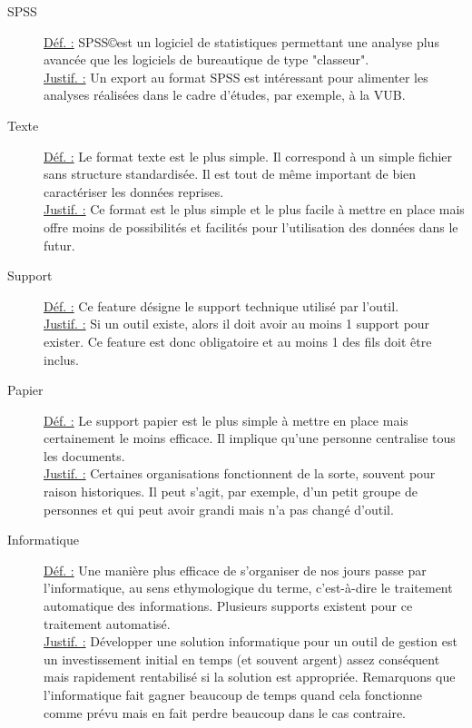 \begin{description}
\item [SPSS]
\underline{Déf. :}  SPSS\copyright est un logiciel de statistiques permettant une analyse plus avancée que les logiciels de bureautique de type "classeur".
\\ \underline{Justif. :}  Un export au format SPSS est intéressant pour alimenter les analyses réalisées dans le cadre d'études,  par exemple,  à la VUB.
\newline

\item [Texte]
\underline{Déf. :}  Le format texte est le plus simple.  Il correspond à un simple fichier sans structure standardisée.   Il est tout de même important de bien caractériser les données reprises.
\\ \underline{Justif. :}  Ce format est le plus simple et le plus facile à mettre en place mais offre moins de possibilités et facilités pour l'utilisation des données dans le futur.
\newline

\begin{center}
\end{center}

\item [Support]
\underline{Déf. :}  Ce feature désigne le support technique utilisé par l'outil.
\\ \underline{Justif. :}  Si un outil existe,  alors il doit avoir au moins 1 support pour exister.  Ce feature est donc obligatoire et au moins 1 des fils doit être inclus.
\newline

\item [Papier]
\underline{Déf. :}  Le support papier est le plus simple à mettre en place mais certainement le moins efficace.  Il implique qu'une personne centralise tous les documents.
\\ \underline{Justif. :}  Certaines organisations fonctionnent de la sorte,  souvent pour raison historiques.  Il peut s'agit,  par exemple,  d'un petit groupe de personnes et qui peut avoir grandi mais n'a pas changé d'outil.
\newline

\item [Informatique]
\underline{Déf. :}  Une manière plus efficace de s'organiser de nos jours passe par l'informatique,  au sens ethymologique du terme,  c'est-à-dire le traitement automatique des informations.  Plusieurs supports existent pour ce traitement automatisé.
\\ \underline{Justif. :}  Développer une solution informatique pour un outil de gestion est un investissement initial en temps (et souvent argent) assez conséquent mais rapidement rentabilisé si la solution est appropriée.  Remarquons que l'informatique fait gagner beaucoup de temps quand cela fonctionne comme prévu mais en fait perdre beaucoup dans le cas contraire.
\newline


\end{description}
